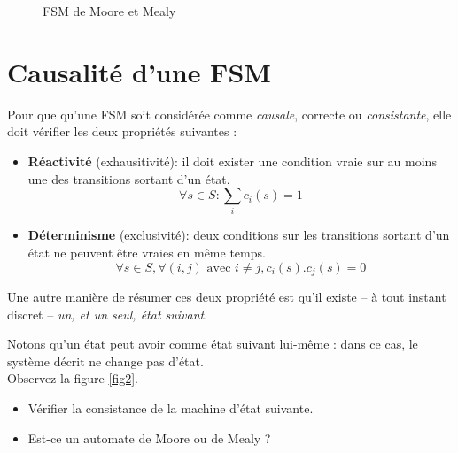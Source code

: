 \documentclass[a4paper,11pt]{article}
\begin{document}
\begin{figure}[!h]
    \centering
    \qquad
    \caption{FSM de Moore et Mealy}%
    \label{fig:example}%
\end{figure}


\section{Causalité d'une FSM}
Pour que qu'une FSM  soit considérée comme {\it causale}, correcte ou {\it consistante}, elle doit vérifier les deux propriétés suivantes :
\begin{itemize}
\item \textbf{Réactivité} (exhausitivité): il doit exister une condition vraie sur au moins une des transitions sortant d'un état.
$$\forall s \in S : \sum_i c_i(s)=1$$
\item \textbf{Déterminisme} (exclusivité): deux conditions sur les transitions sortant d'un état ne peuvent être vraies en même temps.
$$\forall s \in S, \forall (i,j) \text{ avec } i \neq j, c_i(s).c_j(s)=0$$
\end{itemize}

Une autre manière de résumer ces deux propriété est qu'il existe -- à tout instant discret -- {\it un, et un seul, état suivant}.

Notons qu'un état peut avoir comme état suivant lui-même : dans ce cas, le système décrit ne change pas d'état.\\


Observez la figure \ref{fig2}.
\begin{itemize}
\item Vérifier la consistance de la machine d'état suivante.
\item Est-ce un automate de Moore ou de Mealy ?
\end{itemize}
\end{document}
